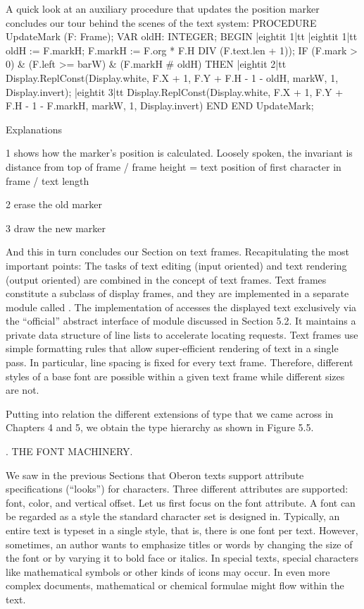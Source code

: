 A quick look at an auxiliary procedure that updates the position marker concludes our tour behind the scenes of the text system:
\begintt
PROCEDURE UpdateMark (F: Frame);
  VAR oldH: INTEGER;
BEGIN |eightit 1|tt  
|eightit 1|tt    oldH := F.markH; F.markH := F.org * F.H DIV (F.text.len + 1));
  IF (F.mark > 0) & (F.left >= barW) & (F.markH # oldH) THEN
|eightit 2|tt      Display.ReplConst(Display.white, F.X + 1, F.Y + F.H - 1 - oldH, markW, 1, Display.invert);
|eightit 3|tt      Display.ReplConst(Display.white, F.X + 1, F.Y + F.H - 1 - F.markH, markW, 1, Display.invert)
  END
END UpdateMark;
\endtt

\noindent Explanations

\item{1} shows how the marker's position is calculated. Loosely spoken, the invariant is distance from top of frame / frame height = text position of first character in frame / text length
\item{2} erase the old marker
\item{3} draw the new marker

\noindent And this in turn concludes our Section on text frames. Recapitulating the most important points: The tasks of text editing (input oriented) and text rendering (output oriented) are combined in the concept of text frames. Text frames constitute a subclass of display frames, and they are implemented in a separate module called . The implementation of  accesses the displayed text exclusively via the ``official'' abstract interface of module  discussed in Section 5.2. It maintains a private data structure of line lists to accelerate locating requests. Text frames use simple formatting rules that allow super-efficient rendering of text in a single pass. In particular, line spacing is fixed for every text frame. Therefore, different styles of a base font are possible within a given text frame while different sizes are not.

Putting into relation the different extensions of type  that we came across in Chapters 4 and 5, we obtain the type hierarchy as shown in Figure 5.5.


. THE FONT MACHINERY.

We saw in the previous Sections that Oberon texts support attribute specifications (``looks'') for characters. Three different attributes are supported: font, color, and vertical offset. Let us first focus on the font attribute. A font can be regarded as a style the standard character set is designed in. Typically, an entire text is typeset in a single style, that is, there is one font per text. However, sometimes, an author wants to emphasize titles or words by changing the size of the font or by varying it to bold face or italics. In special texts, special characters like mathematical symbols or other kinds of icons may occur. In even more complex documents, mathematical or chemical formulae might flow within the text.

